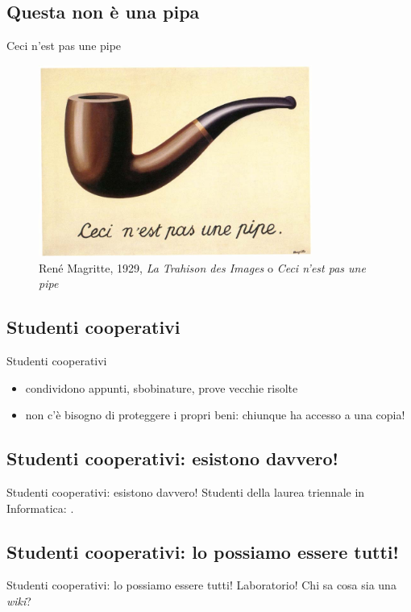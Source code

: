 \documentclass{beamer}
\begin{document}
\subsection{Questa non è una pipa}
\begin{frame}{Ceci n'est pas une pipe}
  \begin{figure}
    \includegraphics[width=0.8\textwidth]{assets/magritte-pipe.jpg}
    \caption{René Magritte, 1929, \emph{La Trahison des Images} o \emph{Ceci n'est
      pas une pipe}}
  \end{figure}
\end{frame}

\subsection{Studenti cooperativi}
\begin{frame}{Studenti cooperativi}
  \begin{itemize}
    \item<1-> condividono appunti, sbobinature, prove vecchie risolte
    \item<2-> non c'è bisogno di proteggere i propri beni: chiunque ha accesso a
      una copia!
  \end{itemize}
\end{frame}

\subsection{Studenti cooperativi: esistono davvero!}
\begin{frame}{Studenti cooperativi: esistono davvero!}
  Studenti della laurea triennale in Informatica:
  \href{https://csunibo.github.io/}{}.
\end{frame}

\subsection{Studenti cooperativi: lo possiamo essere tutti!}
\begin{frame}{Studenti cooperativi: lo possiamo essere tutti!}
  Laboratorio! Chi sa cosa sia una \emph{wiki}?
\end{frame}
\end{document}
